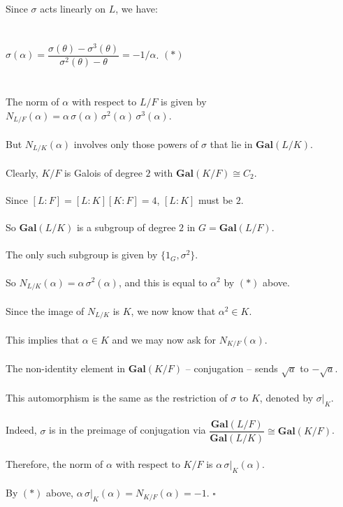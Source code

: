 \documentclass{article}
\begin{document}
Since $\sigma$ acts linearly on $L$, we have: \\\\\\
\indent $\sigma(\alpha) = \dfrac{\sigma(\theta) - \sigma^3(\theta)}{\sigma^2(\theta) - \theta} = -1/\alpha$. $(\ast)$ \\\\\\
The norm of $\alpha$ with respect to $L/F$ is given by $N_{L/F}(\alpha) = \alpha \, \sigma(\alpha) \, \sigma^2(\alpha)\, \sigma^3(\alpha)$. \\\\
But $N_{L/K}(\alpha)$ involves only those powers of $\sigma$ that lie in $\textbf{Gal}(L/K)$. \\\\
\indent Clearly, $K/F$ is Galois of degree $2$ with $\textbf{Gal}(K/F) \cong C_2$. \\\\
\indent Since $[L:F] = [L:K][K:F] = 4$, $[L:K]$ must be $2$. \\\\
\indent So $\textbf{Gal}(L/K)$ is a subgroup of degree $2$ in $G = \textbf{Gal}(L/F).$ \\\\
\indent The only such subgroup is given by $\{1_G, \sigma^2\}$. \\\\
So $N_{L/K}(\alpha) = \alpha \, \sigma^2(\alpha)$, and this is equal to $\alpha^2$ by $(\ast)$ above. \\\\
Since the image of $N_{L/K}$ is $K$, we now know that $\alpha^2 \in K$. \\\\
This implies that $\alpha \in K$ and we may now ask for $N_{K/F}(\alpha)$. \\\\
The non-identity element in $\textbf{Gal}(K/F)$ -- conjugation -- sends $\sqrt{a}$ to $-\sqrt{a}$. \\\\
This automorphism is the same as the restriction of $\sigma$ to $K$, denoted by $\sigma|_K$. \\\\
Indeed, $\sigma$ is in the preimage of conjugation via $\dfrac{\textbf{Gal}(L/F)}{\textbf{Gal}(L/K)} \cong \textbf{Gal}(K/F)$. \\\\
Therefore, the norm of $\alpha$ with respect to $K/F$ is $\alpha \, \sigma|_K(\alpha)$. \\\\
By $(\ast)$ above, $\alpha \, \sigma|_K(\alpha) = N_{K/F}(\alpha) = -1$. $\square$ \\\\\\
\end{document}
